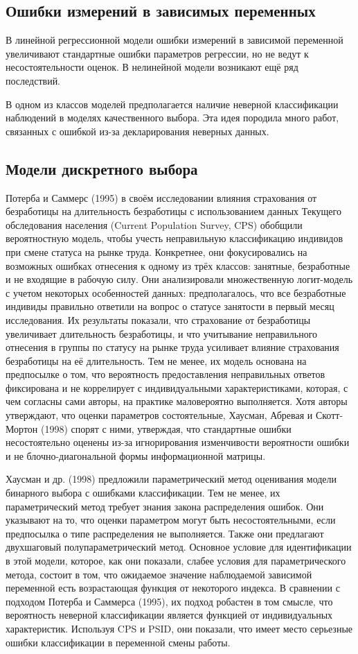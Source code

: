 \subsection{Ошибки измерений в зависимых переменных} 
В линейной регрессионной модели ошибки измерений в зависимой переменной увеличивают стандартные ошибки параметров регрессии, но не ведут к несостоятельности оценок. В нелинейной модели возникают ещё ряд последствий.

В одном из классов моделей предполагается наличие неверной классификации наблюдений в моделях качественного выбора. Эта идея породила много работ, связанных с ошибкой из-за декларирования неверных данных.

\subsection*{Модели дискретного выбора} 

Потерба и Саммерс (1995) в своём исследовании влияния страхования от безработицы на длительность безработицы с использованием данных Текущего обследования населения (Current Population Survey, CPS) обобщили вероятностную модель, чтобы учесть неправильную классификацию индивидов при смене статуса на рынке труда. Конкретнее, они фокусировались на возможных ошибках отнесения к одному из трёх классов: занятные, безработные и не входящие в рабочую силу. Они анализировали множественную логит-модель с учетом некоторых особенностей данных: предполагалось, что все безработные индивиды правильно ответили на вопрос о статусе занятости в первый месяц исследования. Их результаты показали, что страхование от безработицы увеличивает длительность безработицы, и что учитывание неправильного отнесения в группы по статусу на рынке труда усиливает  влияние страхования безработицы на её длительность. Тем не менее, их модель основана на предпосылке о том, что вероятность предоставления неправильных ответов фиксирована и не коррелирует с индивидуальными характеристиками, которая, с чем согласны сами авторы, на практике маловероятно выполняется. Хотя авторы утверждают, что оценки параметров состоятельные, Хаусман, Абревая и Скотт-Мортон (1998) спорят с ними, утверждая, что стандартные ошибки несостоятельно оценены из-за игнорирования изменчивости вероятности ошибки и не блочно-диагональной формы информационной матрицы.

Хаусман и др. (1998) предложили параметрический метод оценивания модели бинарного выбора с ошибками классификации. Тем не менее, их параметрический метод требует знания закона распределения ошибок. Они указывают на то, что оценки параметром могут быть несостоятельными, если предпосылка о типе распределения не выполняется. Также они предлагают двухшаговый полупараметрический метод. Основное условие для идентификации в этой модели, которое, как они показали, слабее условия для параметрического метода, состоит в том, что ожидаемое значение наблюдаемой зависимой переменной есть возрастающая функция от некоторого индекса. В сравнении с подходом Потерба и Саммерса (1995), их подход робастен в том смысле, что вероятность неверной классификации является функцией от индивидуальных характеристик. Используя CPS и PSID, они показали, что имеет место серьезные ошибки классификации в переменной смены работы.


